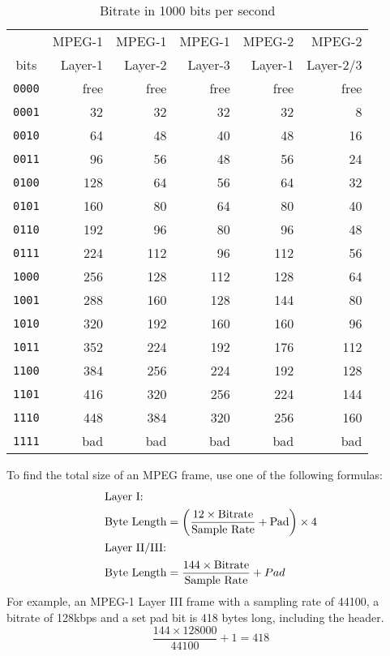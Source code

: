 \pagebreak

\begin{table}[h]
{
\begin{tabular}{|c||r|r|r|r|r|}
\hline
& MPEG-1 & MPEG-1 & MPEG-1 & MPEG-2 & MPEG-2 \\
bits & Layer-1 & Layer-2 & Layer-3 & Layer-1 & Layer-2/3 \\
\hline
\texttt{0000} & free & free & free & free & free \\
\texttt{0001} & 32 & 32 & 32 & 32 & 8 \\
\texttt{0010} & 64 & 48 & 40 & 48 & 16 \\
\texttt{0011} & 96 & 56 & 48 & 56 & 24 \\
\texttt{0100} & 128 & 64 & 56 & 64 & 32 \\
\texttt{0101} & 160 & 80 & 64 & 80 & 40 \\
\texttt{0110} & 192 & 96 & 80 & 96 & 48 \\
\texttt{0111} & 224 & 112 & 96 & 112 & 56 \\
\texttt{1000} & 256 & 128 & 112 & 128 & 64 \\
\texttt{1001} & 288 & 160 & 128 & 144 & 80 \\
\texttt{1010} & 320 & 192 & 160 & 160 & 96 \\
\texttt{1011} & 352 & 224 & 192 & 176 & 112 \\
\texttt{1100} & 384 & 256 & 224 & 192 & 128 \\
\texttt{1101} & 416 & 320 & 256 & 224 & 144 \\
\texttt{1110} & 448 & 384 & 320 & 256 & 160 \\
\texttt{1111} & bad & bad & bad & bad & bad \\
\hline
\end{tabular}
}
\caption{Bitrate in 1000 bits per second}
\end{table}
To find the total size of an MPEG frame, use one of the following
formulas:
\begin{align}
\intertext{Layer I:}
\text{Byte Length} &= \left ( \frac{12 \times \text{Bitrate}}{\text{Sample Rate}} + \text{Pad} \right ) \times 4 \\
\intertext{Layer II/III:}
\text{Byte Length} &= \frac{144 \times \text{Bitrate}}{\text{Sample Rate}} + Pad
\end{align}
For example, an MPEG-1 Layer III frame with a sampling rate of 44100,
a bitrate of 128kbps and a set pad bit is 418 bytes long, including the header.
\begin{equation}
\frac{144 \times 128000}{44100} + 1 = 418
\end{equation}

